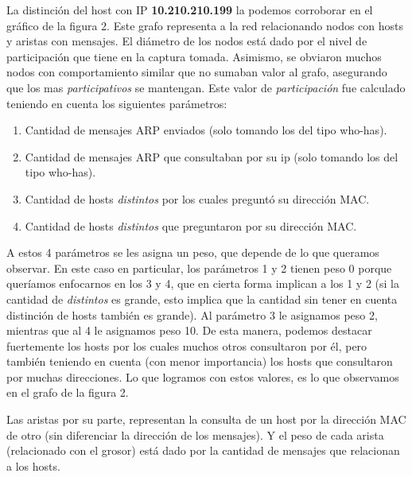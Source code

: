 \par La distinción del host con IP \textbf{10.210.210.199} la podemos corroborar en el gráfico de la figura 2. Este grafo representa a la red relacionando nodos con hosts y aristas con mensajes. El diámetro de los nodos está dado por el nivel de participación que tiene en la captura tomada. Asimismo, se obviaron muchos nodos con comportamiento similar que no sumaban valor al grafo, asegurando que los mas \textit{participativos} se mantengan. Este valor de \textit{participación} fue calculado teniendo en cuenta los siguientes parámetros:

\begin{enumerate}
	\item Cantidad de mensajes ARP enviados (solo tomando los del tipo who-has).
	\item Cantidad de mensajes ARP que consultaban por su ip (solo tomando los del tipo who-has).
	\item Cantidad de hosts \textit{distintos} por los cuales preguntó su dirección MAC.
	\item Cantidad de hosts \textit{distintos} que preguntaron por su dirección MAC.
\end{enumerate}

\par A estos 4 parámetros se les asigna un peso, que depende de lo que queramos observar. En este caso en particular, los parámetros 1 y 2 tienen peso 0 porque queríamos enfocarnos en los 3 y 4, que en cierta forma implican a los 1 y 2 (si la cantidad de \textit{distintos} es grande, esto implica que la cantidad sin tener en cuenta distinción de hosts también es grande). Al parámetro 3 le asignamos peso 2, mientras que al 4 le asignamos peso 10. De esta manera, podemos destacar fuertemente los hosts por los cuales muchos otros consultaron por él, pero también teniendo en cuenta (con menor importancia) los hosts que consultaron por muchas direcciones. Lo que logramos con estos valores, es lo que observamos en el grafo de la figura 2.
\par Las aristas por su parte, representan la consulta de un host por la dirección MAC de otro (sin diferenciar la dirección de los mensajes). Y el peso de cada arista (relacionado con el grosor) está dado por la cantidad de mensajes que relacionan a los hosts.

